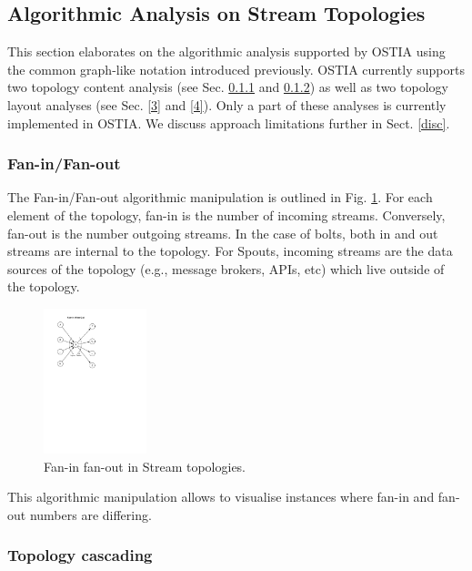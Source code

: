 \subsection{Algorithmic Analysis on Stream Topologies}\label{algo}

This section elaborates on the algorithmic analysis supported by OSTIA using the common graph-like notation introduced previously. OSTIA currently supports two topology content analysis (see Sec. \ref{1} and \ref{2}) as well as two topology layout analyses (see Sec. \ref{3} and \ref{4}). Only a part of these analyses is currently implemented in OSTIA. We discuss approach limitations further in Sect. \ref{disc}.

\subsubsection{Fan-in/Fan-out}\label{1}

The Fan-in/Fan-out algorithmic manipulation is outlined in Fig. \ref{fig:fan}. For each element of the topology, fan-in is the number of incoming
streams. Conversely, fan-out is the number outgoing streams. In the case of
bolts, both in and out streams are internal to the topology. For Spouts,
incoming streams are the data sources of the topology (e.g., message brokers,
APIs, etc) which live outside of the topology.

\begin{figure}
	\begin{center}
		\includegraphics[width=3cm]{images/fan-in-out}
		\caption{Fan-in fan-out in Stream topologies.}
		\label{fig:fan}
	\end{center}
\end{figure}

This algorithmic manipulation allows to visualise instances where fan-in and fan-out numbers are differing.

\subsubsection{Topology cascading}\label{2}

